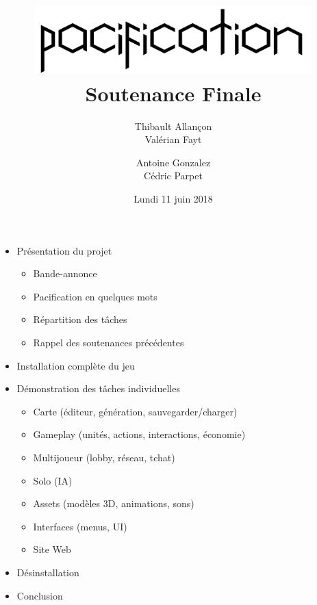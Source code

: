 \documentclass[14pt]{extarticle}
\title{
	{\protect\centering\protect\includegraphics[width=0.8\textwidth]{Pacification_logo}}\\
	{Soutenance Finale}\\
}
\author{
	Thibault Allançon\\
	Valérian Fayt
	\and
	Antoine Gonzalez\\
	Cédric Parpet
}
\date{Lundi 11 juin 2018}
\begin{document}
\maketitle

\begin{itemize}
    \item Présentation du projet
    \begin{itemize}
        \item Bande-annonce
        \item Pacification en quelques mots
        \item Répartition des tâches
        \item Rappel des soutenances précédentes
    \end{itemize}

    \item Installation complète du jeu

    \item Démonstration des tâches individuelles
    \begin{itemize}
        \item Carte (éditeur, génération, sauvegarder/charger)
        \item Gameplay (unités, actions, interactions, économie)
        \item Multijoueur (lobby, réseau, tchat)
        \item Solo (IA)
        \item Assets (modèles 3D, animations, sons)
        \item Interfaces (menus, UI)
	\item Site Web
    \end{itemize}

    \item Désinstallation
    \item Conclusion
\end{itemize}
\end{document}
